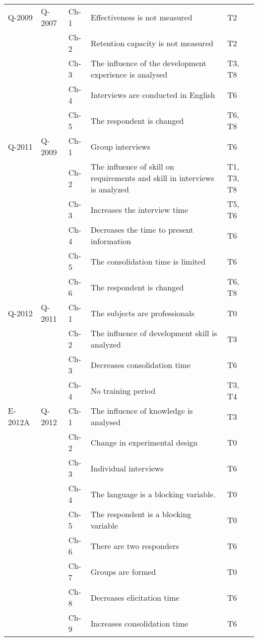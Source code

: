 \begin{table}
\begin{minipage}{6cm}
\begin{tabular}{| l | l | l |p{6cm} | p{1cm}|}
Q-2009 & Q-2007 & Ch-1 & Effectiveness is not measured  & T2 \\
~ & ~ & Ch-2 & Retention capacity is not measured  & T2 \\
~ & ~ & Ch-3 & The influence of the development experience is analysed  & T3, T8 \\
~ & ~ & Ch-4 & Interviews are conducted in English  & T6 \\
~ & ~ & Ch-5 & The respondent is changed  & T6, T8 \\ \hline
Q-2011 & Q-2009 & Ch-1 & Group interviews  & T6 \\
~ & ~ & Ch-2 & The influence of skill on requirements and skill in interviews is analyzed  & T1, T3, T8 \\
~ & ~ & Ch-3 & Increases the interview time  & T5, T6 \\
~ & ~ & Ch-4 & Decreases the time to present information  & T6 \\
~ & ~ & Ch-5 & The consolidation time is limited  & T6 \\
~ & ~ & Ch-6 & The respondent is changed  & T6, T8 \\ \hline
Q-2012 & Q-2011 & Ch-1 & The subjects are professionals  & T0 \\
~ & ~ & Ch-2 & The influence of development skill is analyzed  & T3 \\
~ & ~ & Ch-3 & Decreases consolidation time  & T6 \\
~ & ~ & Ch-4 & No training period  & T3, T4 \\ \hline
E-2012A & Q-2012 & Ch-1 & The influence of knowledge is analysed  & T3 \\
~ & ~ & Ch-2 &  Change in experimental design  & T0 \\
~ & ~ & Ch-3 &  Individual interviews  & T6 \\
~ & ~ & Ch-4 &  The language is a blocking variable.  & T0 \\
~ & ~ & Ch-5 &  The respondent is a blocking variable  & T0 \\
~ & ~ & Ch-6 &  There are two responders  & T6 \\%
~ & ~ & Ch-7 &  Groups are formed  & T0 \\ 
~ & ~ & Ch-8 &  Decreases elicitation time  & T6 \\
~ & ~ & Ch-9 &  Increases consolidation time  & T6 \\

\end{tabular}
\end{minipage}
\end{table}
